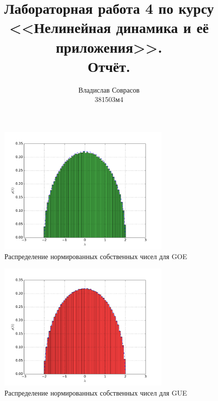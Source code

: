 \documentclass[a4paper]{article}
\begin{document}
\title{Лабораторная работа 4 по курсу <<Нелинейная динамика и её приложения>>. \\Отчёт.}
\author{Владислав Соврасов\\ 381503м4}
\date{}
\maketitle

\section{}

\begin{figure}[H]
	\center
	\includegraphics[width=0.75\textwidth]{../pictures/lab4_goe_eig_hist.pdf}
	\caption{Распределение нормированных собственных чисел для GOE}
	\label{fig:goe_eig}
\end{figure}

\begin{figure}[H]
	\center
	\includegraphics[width=0.75\textwidth]{../pictures/lab4_gue_eig_hist.pdf}
	\caption{Распределение нормированных собственных чисел для GUE}
	\label{fig:gue_eig}
\end{figure}
\end{document}
